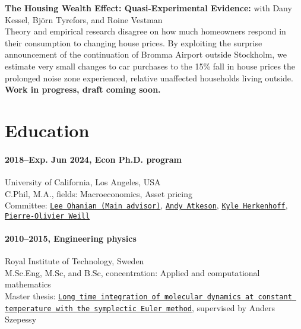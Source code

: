 \documentclass[letterpaper,10pt]{article}
\newcommand{\bold}[1]{\ifhmode\hspace{6pt}\fi\textbf{#1:}}
\begin{document}
\bold{The Housing Wealth Effect: Quasi-Experimental Evidence} with Dany Kessel, Bj\"orn Tyrefors, and Roine Vestman\\
Theory and empirical research disagree on how much homeowners respond in their consumption to changing house prices. By exploiting the surprise announcement of the continuation of Bromma Airport outside Stockholm, we estimate very small changes to car purchases to the 15\% fall in house prices the prolonged noise zone experienced, relative unaffected households living outside. \textbf{Work in progress, draft coming soon.}

\section*{Education}
\paragraph{2018--Exp. Jun 2024, Econ Ph.D. program}\hfill University of California, Los Angeles, USA\\
C.Phil, M.A., fields: Macroeconomics, Asset pricing\\
Committee: \href{https://www.leeohanian.com/}{\texttt{Lee Ohanian (Main advisor)}}, \href{https://sites.google.com/site/andyatkeson/}{\texttt{Andy Atkeson}}, \href{https://sites.google.com/site/kyleherkenhoff/}{\texttt{Kyle Herkenhoff}}, \href{https://sites.google.com/site/pierreolivierweill/}{\texttt{Pierre-Olivier Weill}}

\paragraph{2010--2015, Engineering physics}\hfill Royal Institute of Technology, Sweden\\
M.Sc.Eng, M.Sc, and B.Sc, concentration: Applied and computational mathematics\\
Master thesis: \href{https://www.diva-portal.org/smash/record.jsf?pid=diva2\%3A808180&dswid=-588}{\texttt{Long time integration of mole\-cular dynamics at constant  temperature with the symplectic Euler method}}, supervised by  Anders Szepessy

\end{document}
